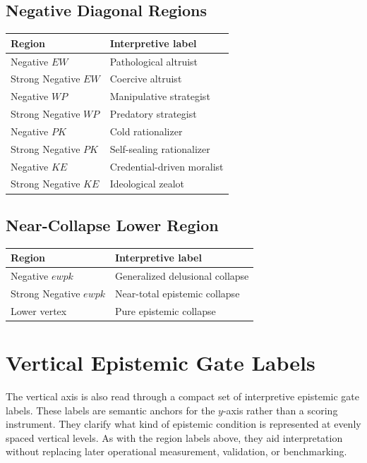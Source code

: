 \documentclass[11pt]{article}
\begin{document}
\subsection*{Negative Diagonal Regions}
\begin{center}
\begin{tabular}{>{\raggedright\arraybackslash}p{4.6cm} >{\raggedright\arraybackslash}p{8.6cm}}
\toprule
Region & Interpretive label \\
\midrule
Negative $EW$ & Pathological altruist \\
Strong Negative $EW$ & Coercive altruist \\
Negative $WP$ & Manipulative strategist \\
Strong Negative $WP$ & Predatory strategist \\
Negative $PK$ & Cold rationalizer \\
Strong Negative $PK$ & Self-sealing rationalizer \\
Negative $KE$ & Credential-driven moralist \\
Strong Negative $KE$ & Ideological zealot \\
\bottomrule
\end{tabular}
\end{center}

\subsection*{Near-Collapse Lower Region}
\begin{center}
\begin{tabular}{>{\raggedright\arraybackslash}p{4.6cm} >{\raggedright\arraybackslash}p{8.6cm}}
\toprule
Region & Interpretive label \\
\midrule
Negative $ewpk$ & Generalized delusional collapse \\
Strong Negative $ewpk$ & Near-total epistemic collapse \\
Lower vertex & Pure epistemic collapse \\
\bottomrule
\end{tabular}
\end{center}

\clearpage
\section{Vertical Epistemic Gate Labels}

The vertical axis is also read through a compact set of interpretive epistemic gate labels. These labels are semantic anchors for the $y$-axis rather than a scoring instrument. They clarify what kind of epistemic condition is represented at evenly spaced vertical levels. As with the region labels above, they aid interpretation without replacing later operational measurement, validation, or benchmarking.
\end{document}
